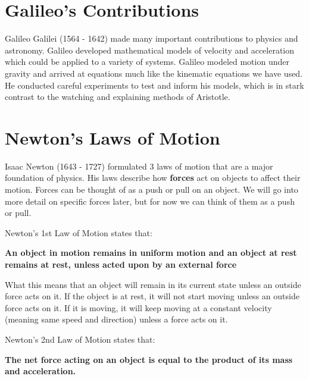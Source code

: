 \documentclass[12pt]{book}
\begin{document}
\section{Galileo's Contributions}

Galileo Galilei (1564 - 1642) made many important contributions to physics and astronomy. Galileo developed mathematical models of velocity and acceleration which could be applied to a variety of systems. Galileo modeled motion under gravity and arrived at equations much like the kinematic equations we have used. He conducted careful experiments to test and inform his models, which is in stark contrast to the watching and explaining methods of Aristotle.


\section{Newton's Laws of Motion}

Isaac Newton (1643 - 1727) formulated 3 laws of motion that are a major foundation of physics. His laws describe how \textbf{forces} act on objects to affect their motion. Forces can be thought of as a push or pull on an object. We will go into more detail on specific forces later, but for now we can think of them as a push or pull.

\linespace

Newton's 1st Law of Motion states that:

\hspace{10pt}

\textbf{An object in motion remains in uniform motion and an object at rest remains at rest, unless acted upon by an external force}

\linespace

What this means that an object will remain in its current state unless an outside force acts on it. If the object is at rest, it will not start moving unless an outside force acts on it. If it is moving, it will keep moving at a constant velocity (meaning same speed and direction) unless a force acts on it.

\linespace

Newton's 2nd Law of Motion states that:



\hspace{10pt}

\textbf{The net force acting on an object is equal to the product of its mass and acceleration.}
\end{document}
